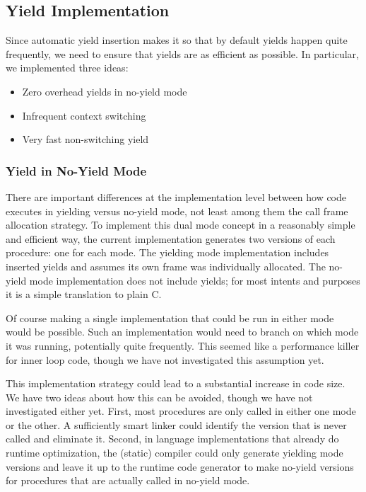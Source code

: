 \documentclass[9pt,preprint]{sigplanconf}
\begin{document}
\subsection{Yield Implementation}
\label{sec:yield_imp}

Since automatic yield insertion makes it so that by default yields happen quite frequently, we need to ensure that yields are as efficient as possible.
In particular, we implemented three ideas:

\begin{itemize}
\item Zero overhead yields in no-yield mode
\item Infrequent context switching
\item Very fast non-switching yield
\end{itemize}

\subsubsection{Yield in No-Yield Mode}

There are important differences at the implementation level between how code executes in yielding versus no-yield mode, not least among them the call frame allocation strategy.
To implement this dual mode concept in a reasonably simple and efficient way, the current \charcoal{} implementation generates two versions of each procedure: one for each mode.
The yielding mode implementation includes inserted yields and assumes its own frame was individually allocated.
The no-yield mode implementation does not include yields; for most intents and purposes it is a simple translation to plain C.

Of course making a single implementation that could be run in either mode would be possible.
Such an implementation would need to branch on which mode it was running, potentially quite frequently.
This seemed like a performance killer for inner loop code, though we have not investigated this assumption yet.

This implementation strategy could lead to a substantial increase in code size.
We have two ideas about how this can be avoided, though we have not investigated either yet.
First, most procedures are only called in either one mode or the other.
A sufficiently smart linker could identify the version that is never called and eliminate it.
Second, in language implementations that already do runtime optimization, the (static) compiler could only generate yielding mode versions and leave it up to the runtime code generator to make no-yield versions for procedures that are actually called in no-yield mode.
\end{document}
